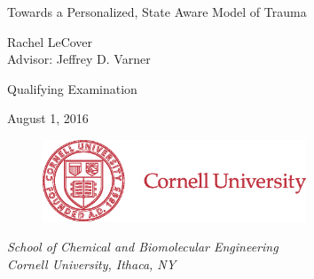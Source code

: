 \documentclass[11pt]{article}
\makeatletter
\renewcommand\section{\@startsection
	{subsection}{2}{0mm}
	{-0.2in}
	{0.05\baselineskip}
	{\normalfont\large\bfseries}}
\makeatother
\begin{document}
\begin{titlepage}
  \begin{center}
    {\LARGE{Towards a Personalized, State Aware Model of Trauma}}\par
    \vspace{5em}
    { \Large{Rachel LeCover} \\
    \vspace{1em}
    { \large{Advisor: Jeffrey D. Varner}}\par
     \vspace{3em}
    { \large{Qualifying Examination}}\par
     \vspace{1em}
    { \large{August 1, 2016}}\par
    \begin{figure}[h]
    \vspace{3em}
       \centering
       \includegraphics[width=0.7\textwidth]{figures/CULogo187}
       \end{figure}
    \vspace{2em} \large{ \textit{School of Chemical and Biomolecular Engineering \\ \vspace{0.5em} Cornell University, Ithaca, NY}}}\par
    \vspace{3em}
  \end{center}
\end{titlepage}
\pagebreak
\setcounter{page}{1}
\end{document}

